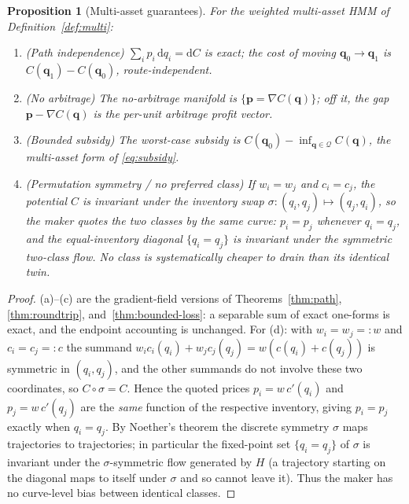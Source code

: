 \documentclass[11pt]{article}
\newtheorem{proposition}[theorem]{Proposition}
\newcommand{\dd}{\mathrm{d}}
\begin{document}
\begin{proposition}[Multi-asset guarantees]
\label{prop:multi}
For the weighted multi-asset HMM of Definition~\ref{def:multi}:
\begin{enumerate}[leftmargin=1.6em,label=(\alph*)]
  \item (Path independence) $\sum_i p_i\,\dd q_i = \dd C$ is exact; the cost of
        moving $\bm q_0\to\bm q_1$ is $C(\bm q_1)-C(\bm q_0)$, route-independent.
  \item (No arbitrage) The no-arbitrage manifold is
        $\{\bm p = \nabla C(\bm q)\}$; off it, the gap $\bm p - \nabla C(\bm q)$ is
        the per-unit arbitrage profit vector.
  \item (Bounded subsidy) The worst-case subsidy is
        $C(\bm q_0)-\inf_{\bm q\in\mathcal Q}C(\bm q)$, the multi-asset form of
        \eqref{eq:subsidy}.
  \item (Permutation symmetry / no preferred class) If $w_i=w_j$ and $c_i=c_j$,
        the potential $C$ is invariant under the inventory swap
        $\sigma:(q_i,q_j)\mapsto(q_j,q_i)$, so the maker quotes the two classes by
        the \emph{same} curve: $p_i = p_j$ whenever $q_i=q_j$, and the equal-inventory
        diagonal $\{q_i=q_j\}$ is invariant under the symmetric two-class flow. No
        class is systematically cheaper to drain than its identical twin.
\end{enumerate}
\end{proposition}

\begin{proof}
(a)--(c) are the gradient-field versions of Theorems~\ref{thm:path},
\ref{thm:roundtrip}, and~\ref{thm:bounded-loss}: a separable sum of exact
one-forms is exact, and the endpoint accounting is unchanged. For (d): with
$w_i=w_j=:w$ and $c_i=c_j=:c$ the summand $w_i c_i(q_i)+w_j c_j(q_j)
=w(c(q_i)+c(q_j))$ is symmetric in $(q_i,q_j)$, and the other summands do not
involve these two coordinates, so $C\circ\sigma=C$. Hence the quoted prices
$p_i=w\,c'(q_i)$ and $p_j=w\,c'(q_j)$ are the \emph{same} function of the
respective inventory, giving $p_i=p_j$ exactly when $q_i=q_j$. By Noether's theorem
the discrete symmetry $\sigma$ maps trajectories to trajectories; in particular the
fixed-point set $\{q_i=q_j\}$ of $\sigma$ is invariant under the
$\sigma$-symmetric flow generated by $H$ (a trajectory starting on the diagonal
maps to itself under $\sigma$ and so cannot leave it). Thus the maker has no
curve-level bias between identical classes.
\end{proof}
\end{document}
